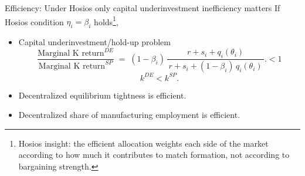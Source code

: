 \documentclass[9pt,xcolor={svgnames}]{beamer}
\begin{document}
\begin{frame}{Efficiency: Under Hosios only capital underinvestment inefficiency matters}
If Hosios condition $\eta_i = \beta_i$ holds\footnote{Hosios insight: the efficient allocation weights each side of the market according to how much it contributes to match formation, not according to bargaining strength.},
\begin{itemize}
   \item Capital underinvestment/hold-up problem
\[
\frac{\text{Marginal K return}^{DE}}{\text{Marginal K return}^{SP}}
\;=\;(1-\beta_i)\,\frac{\,r+s_i+q_i(\theta_i)\,}{\,r+s_i+(1-\beta_i)\,q_i(\theta_i)\,}.
< 1\]
\[k^{DE} < k^{SP}.\] 

\item Decentralized equilibrium tightness is efficient.

\item Decentralized share of manufacturing employment is efficient.
\end{itemize}


\vspace{0.1cm}
\begin{center}
\end{center}
\end{frame}
\end{document}
